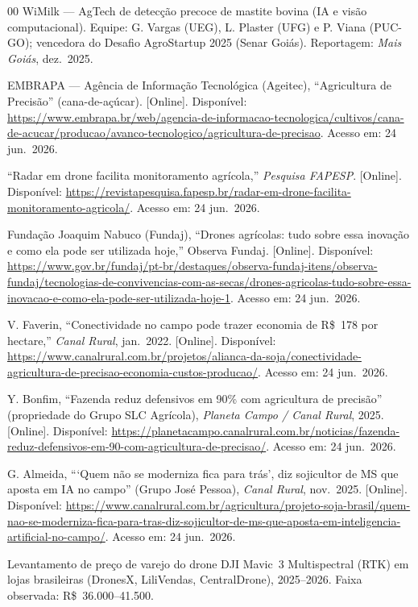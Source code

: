 \documentclass[conference]{IEEEtran}
\newcommand{\rs}{R\$}
\begin{document}
\begin{thebibliography}{00}
 WiMilk --- AgTech de detecção precoce de mastite bovina (IA e visão computacional). Equipe: G. Vargas (UEG), L. Plaster (UFG) e P. Viana (PUC-GO); vencedora do Desafio AgroStartup 2025 (Senar Goiás). Reportagem: \textit{Mais Goiás}, dez.\ 2025.

 EMBRAPA --- Agência de Informação Tecnológica (Ageitec), ``Agricultura de Precisão'' (cana-de-açúcar). [Online]. Disponível: \url{https://www.embrapa.br/web/agencia-de-informacao-tecnologica/cultivos/cana-de-acucar/producao/avanco-tecnologico/agricultura-de-precisao}. Acesso em: 24 jun.\ 2026.

 ``Radar em drone facilita monitoramento agrícola,'' \textit{Pesquisa FAPESP}. [Online]. Disponível: \url{https://revistapesquisa.fapesp.br/radar-em-drone-facilita-monitoramento-agricola/}. Acesso em: 24 jun.\ 2026.

 Fundação Joaquim Nabuco (Fundaj), ``Drones agrícolas: tudo sobre essa inovação e como ela pode ser utilizada hoje,'' Observa Fundaj. [Online]. Disponível: \url{https://www.gov.br/fundaj/pt-br/destaques/observa-fundaj-itens/observa-fundaj/tecnologias-de-convivencias-com-as-secas/drones-agricolas-tudo-sobre-essa-inovacao-e-como-ela-pode-ser-utilizada-hoje-1}. Acesso em: 24 jun.\ 2026.

 V. Faverin, ``Conectividade no campo pode trazer economia de R\$~178 por hectare,'' \textit{Canal Rural}, jan.\ 2022. [Online]. Disponível: \url{https://www.canalrural.com.br/projetos/alianca-da-soja/conectividade-agricultura-de-precisao-economia-custos-producao/}. Acesso em: 24 jun.\ 2026.

 Y. Bonfim, ``Fazenda reduz defensivos em 90\% com agricultura de precisão'' (propriedade do Grupo SLC Agrícola), \textit{Planeta Campo / Canal Rural}, 2025. [Online]. Disponível: \url{https://planetacampo.canalrural.com.br/noticias/fazenda-reduz-defensivos-em-90-com-agricultura-de-precisao/}. Acesso em: 24 jun.\ 2026.

 G. Almeida, ```Quem não se moderniza fica para trás', diz sojicultor de MS que aposta em IA no campo'' (Grupo José Pessoa), \textit{Canal Rural}, nov.\ 2025. [Online]. Disponível: \url{https://www.canalrural.com.br/agricultura/projeto-soja-brasil/quem-nao-se-moderniza-fica-para-tras-diz-sojicultor-de-ms-que-aposta-em-inteligencia-artificial-no-campo/}. Acesso em: 24 jun.\ 2026.

 Levantamento de preço de varejo do drone DJI Mavic~3 Multispectral (RTK) em lojas brasileiras (DronesX, LiliVendas, CentralDrone), 2025--2026. Faixa observada: \rs~36.000--41.500.


\end{thebibliography}
\end{document}
